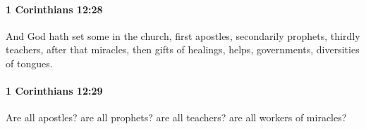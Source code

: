 		\paragraph{1 Corinthians 12:28} %
			\label{1CORINTHIANS-12-28}

			And God hath set some in the church, first apostles, secondarily prophets, thirdly teachers, after that miracles, then gifts of healings, helps, governments, diversities of tongues.

			\begin{framed}
				\scriptsize
				\begin{compactdesc}
					\item[SBLG] 
				\end{compactdesc}
			\end{framed}

		\paragraph{1 Corinthians 12:29} %
			\label{1CORINTHIANS-12-29}

			Are all apostles?  are all prophets?  are all teachers?  are all workers of miracles?

